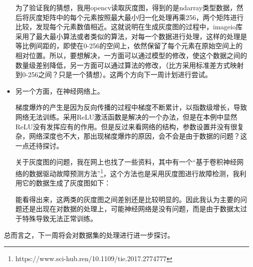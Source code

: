 \documentclass{article}
\begin{document}
\begin{itemize}
		为了验证我的猜想，我用opencv读取灰度图，得到的是ndarray类型数据，然后将灰度矩阵中的每个元素按照最大最小归一化处理再乘256，两个矩阵进行比较，发现每个元素数值相近。这就说明在生成灰度图的过程中，imageio库采用了最大最小算法或者类似的算法，对每一个数据进行处理，这样的处理是等比例间距的，即使在0-256的空间上，依然保留了每个元素在原始空间上的相对位置。所以，要想解决，一方面可以通过模型的修改，使这个数据之间的数量级差别降低，另一方面可以通过算法的修改，（比方采用标准差方式映射到0-256之间？只是一个猜想）。这两个方向下一周计划进行尝试。
		
		\item 另一个方面，在神经网络上。
		
		梯度爆炸的产生是因为反向传播的过程中梯度不断累计，以指数级增长，导致网络无法训练。采用ReLU激活函数是解决的一个办法，但是在本例中显然ReLU没有发挥应有的作用。但是反过来看网络的结构，参数设置并没有很复杂，网络深度也不大，那出现梯度爆炸的原因，会不会是由于数据的问题？这一点还待探讨。
	
		关于灰度图的问题，我在网上也找了一些资料，其中有一个“基于卷积神经网络的数据驱动故障预测方法”\footnote{https://www.sci-hub.ren/10.1109/tie.2017.2774777}，这个方法也是采用灰度图进行故障检测，我利用它的数据生成了灰度图如下：
			
		\begin{figure}[h]
			\centering
		\end{figure}
	
		能看得出来，这两类的灰度图之间差别还是比较明显的。因此我认为主要的问题还是出现在对数据的处理上，可能神经网络是没有问题，而是由于数据太过于特殊导致无法正常训练。
	\end{itemize}
	
	总而言之，下一周将会对数据集的处理进行进一步探讨。
\end{document}
